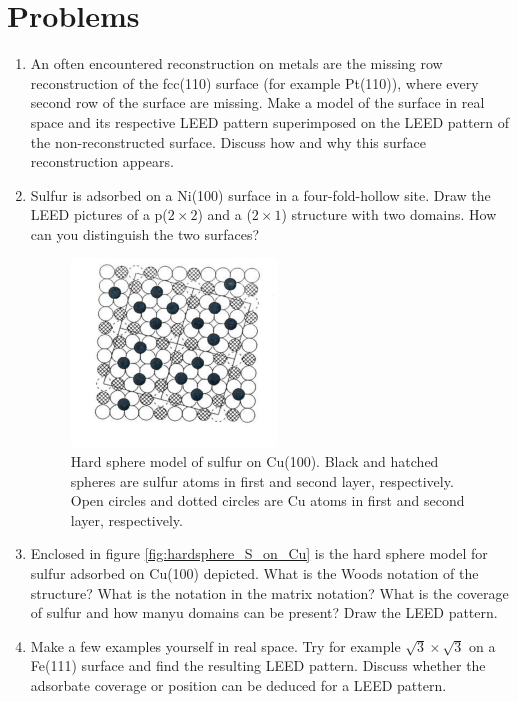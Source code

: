 \section{Problems}
\begin{enumerate}
\item An often encountered reconstruction on metals are the missing row reconstruction of the fcc(110) surface (for example Pt(110)), where every second row of the surface are missing. Make a model of the surface in real space and its respective LEED pattern superimposed on the LEED pattern of the non-reconstructed surface. Discuss how and why this surface reconstruction appears.

\item Sulfur is adsorbed on a Ni(100) surface in a four-fold-hollow site. Draw the LEED pictures of a p($2\times 2$) and a ($2\times 1$) structure with two domains. How can you distinguish the two surfaces?

\begin{figure}[h!]
	\begin{center}
	\includegraphics[scale=4]{figures/09_16.png}
	\caption{Hard sphere model of sulfur on Cu(100). Black and hatched spheres are sulfur atoms in first and second layer, respectively. Open circles and dotted circles are Cu atoms in first and second layer, respectively.}
	\label{fig:hardsphere_S_on_Cu}
	\end{center}
\end{figure}

\item Enclosed in figure \autoref{fig:hardsphere_S_on_Cu} is the hard sphere model for sulfur adsorbed on Cu(100) depicted. What is the Woods notation of the structure? What is the notation in the matrix notation? What is the coverage of sulfur and how manyu domains can be present? Draw the LEED pattern.

\item Make a few examples yourself in real space. Try for example $\sqrt3\times \sqrt3$ on a Fe(111) surface and find the resulting LEED pattern. Discuss whether the adsorbate coverage or position can be deduced for a LEED pattern.


\end{enumerate}
